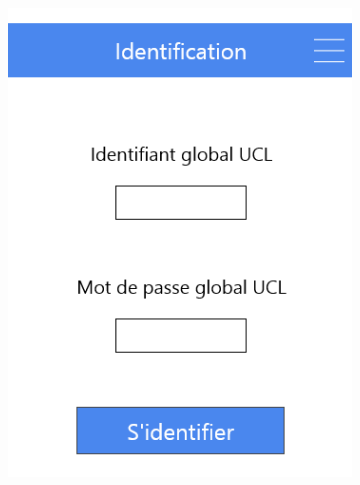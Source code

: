 \documentclass{eplmastersthesis}
\begin{document}
\begin{figure}[H]
\begin{subfigure}[b]{0.3\textwidth}
        \includegraphics[width=\textwidth]{Images/InVision/menu-login.png}
    \end{subfigure}
\end{figure}
\end{document}
